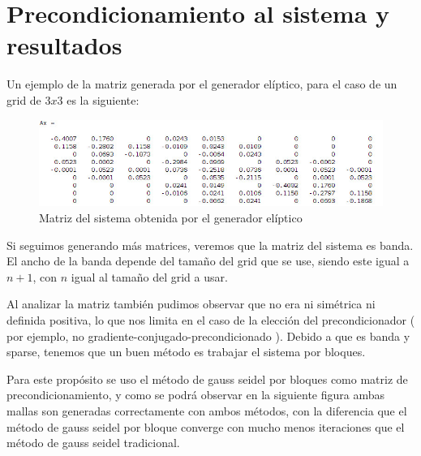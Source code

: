 \documentclass[11pt,letterpaper]{article}
\begin{document}
\section{Precondicionamiento al sistema y resultados}

Un ejemplo de la matriz generada por el generador el\'iptico, para el caso de un grid de $3x3$ es la siguiente:

\begin{figure}[H]
	\begin{minipage}{.49\linewidth}
		\centering
		\includegraphics[scale=0.44]{./imgs/img_sys_matrix_3_3.jpg}
	\end{minipage}
	\caption{Matriz del sistema obtenida por el generador el\'iptico}
\end{figure}

Si seguimos generando m\'as matrices, veremos que la matriz del sistema es banda. El ancho de la banda depende del tamaño del grid que se use, siendo este igual a $n + 1$, con $n$ igual al tamaño del grid a usar.

Al analizar la matriz tambi\'en pudimos observar que no era ni sim\'etrica ni definida positiva, lo que nos limita en el caso de la elecci\'on del precondicionador ( por ejemplo, no gradiente-conjugado-precondicionado ). Debido a que es banda y sparse, tenemos que un buen método es trabajar el sistema por bloques.

Para este propósito se uso el método de gauss seidel por bloques como matriz de precondicionamiento, y como se podrá observar en la siguiente figura ambas mallas son generadas correctamente con ambos métodos, con la diferencia que el método de gauss seidel por bloque converge con mucho menos iteraciones que el método de gauss seidel tradicional.
\end{document}

